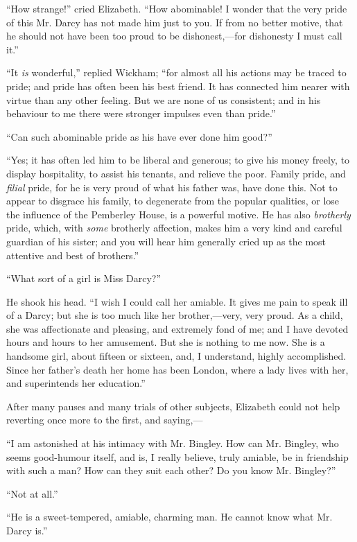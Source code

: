 ``How strange!'' cried Elizabeth. ``How abominable! I wonder that the very pride of this Mr. Darcy has not made him just to you. If from no better motive, that he should not have been too proud to be dishonest,---for dishonesty I must call it.''

``It \textit{is} wonderful,'' replied Wickham; ``for almost all his actions may be traced to pride; and pride has often been his best friend. It has connected him nearer with virtue than any other feeling. But we are none of us consistent; and in his behaviour to me there were stronger impulses even than pride.''

``Can such abominable pride as his have ever done him good?''

``Yes; it has often led him to be liberal and generous; to give his money freely, to display hospitality, to assist his tenants, and relieve the poor. Family pride, and \textit{filial} pride, for he is very proud of what his father was, have done this. Not to appear to disgrace his family, to degenerate from the popular qualities, or lose the influence of the Pemberley House, is a powerful motive. He has also \textit{brotherly} pride, which, with \textit{some} brotherly affection, makes him a very kind and careful guardian of his sister; and you will hear him generally cried up as the most attentive and best of brothers.''

``What sort of a girl is Miss Darcy?''

He shook his head. ``I wish I could call her amiable. It gives me pain to speak ill of a Darcy; but she is too much like her brother,---very, very proud. As a child, she was affectionate and pleasing, and extremely fond of me; and I have devoted hours and hours to her amusement. But she is nothing to me now. She is a handsome girl, about fifteen or sixteen, and, I understand, highly accomplished. Since her father's death her home has been London, where a lady lives with her, and superintends her education.''

After many pauses and many trials of other subjects, Elizabeth could not help reverting once more to the first, and saying,---

``I am astonished at his intimacy with Mr. Bingley. How can Mr. Bingley, who seems good-humour itself, and is, I really believe, truly amiable, be in friendship with such a man? How can they suit each other? Do you know Mr. Bingley?''

``Not at all.''

``He is a sweet-tempered, amiable, charming man. He cannot know what Mr. Darcy is.''

